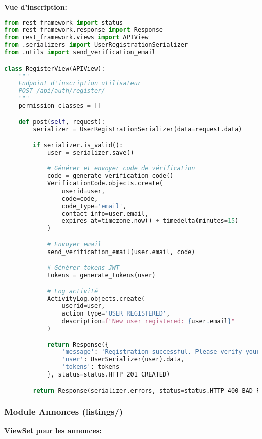 \textbf{Vue d'inscription:}

\begin{lstlisting}[language=Python, caption=users/views.py - RegisterView]
from rest_framework import status
from rest_framework.response import Response
from rest_framework.views import APIView
from .serializers import UserRegistrationSerializer
from .utils import send_verification_email

class RegisterView(APIView):
    """
    Endpoint d'inscription utilisateur
    POST /api/auth/register/
    """
    permission_classes = []

    def post(self, request):
        serializer = UserRegistrationSerializer(data=request.data)

        if serializer.is_valid():
            user = serializer.save()

            # Générer et envoyer code de vérification
            code = generate_verification_code()
            VerificationCode.objects.create(
                userid=user,
                code=code,
                code_type='email',
                contact_info=user.email,
                expires_at=timezone.now() + timedelta(minutes=15)
            )

            # Envoyer email
            send_verification_email(user.email, code)

            # Générer tokens JWT
            tokens = generate_tokens(user)

            # Log activité
            ActivityLog.objects.create(
                userid=user,
                action_type='USER_REGISTERED',
                description=f"New user registered: {user.email}"
            )

            return Response({
                'message': 'Registration successful. Please verify your email.',
                'user': UserSerializer(user).data,
                'tokens': tokens
            }, status=status.HTTP_201_CREATED)

        return Response(serializer.errors, status=status.HTTP_400_BAD_REQUEST)
\end{lstlisting}

\subsubsection{Module Annonces (listings/)}

\textbf{ViewSet pour les annonces:}

